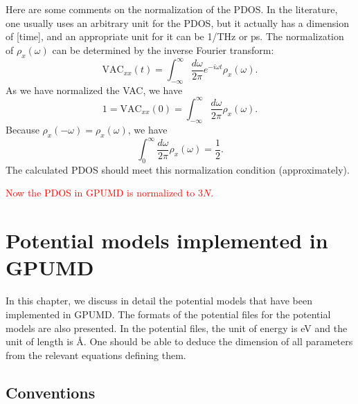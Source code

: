 \documentclass[12pt,a4paper]{report}
\begin{document}
Here are some comments on the normalization of the PDOS. In the literature, one usually uses an arbitrary unit for the PDOS, but it actually has a dimension of [time], and an appropriate unit for it can be 1/THz or ps. The normalization of $\rho_x(\omega)$ can be determined by the inverse Fourier transform:
\begin{equation}
\text{VAC}_{xx}(t)
 = \int_{-\infty}^{\infty} \frac{d\omega}{2\pi} e^{-i\omega t}\rho_x(\omega).
\end{equation}
As we have normalized the VAC, we have
\begin{equation}
1 = \text{VAC}_{xx}(0)
 = \int_{-\infty}^{\infty}
 \frac{d\omega}{2\pi}\rho_x(\omega).
\end{equation}
Because $\rho_x(-\omega)=\rho_x(\omega)$, we have
\begin{equation}
\int_{0}^{\infty}
 \frac{d\omega}{2\pi}\rho_x(\omega) = \frac{1}{2}.
\end{equation}
The calculated PDOS should meet this normalization condition (approximately).

\textcolor{red}{Now the PDOS in GPUMD is normalized to $3N$.}


\chapter{Potential models implemented in GPUMD\label{chapter:potentials}}


In this chapter, we discuss in detail the potential models that have been implemented in GPUMD.
The formats of the potential files for the potential models are also presented. In the potential files, the unit of energy is eV and the unit of length is \AA. One should be able to deduce the dimension of all parameters from the relevant equations defining them.

\section{Conventions}
\end{document}
